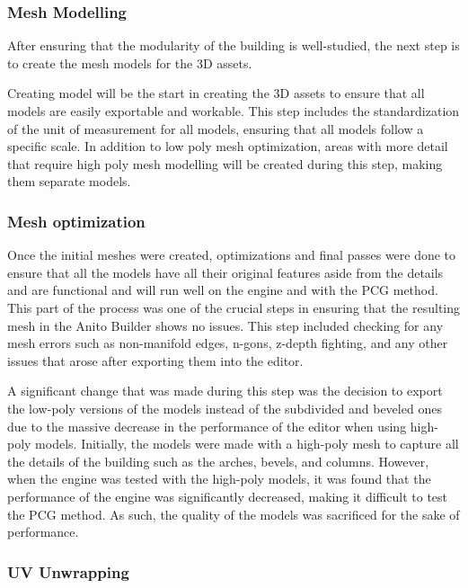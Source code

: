\documentclass[manuscript,screen,12pt]{article}
\begin{document}
\subsubsection{Mesh Modelling}

After ensuring that the modularity of the building is well-studied, the next step is to create the mesh models for the 3D assets.

Creating model will be the start in creating the 3D assets to ensure that all models are easily exportable and workable. This step includes the standardization of the unit of measurement for all models, ensuring that all models follow a specific scale.  In addition to low poly mesh optimization, areas with more detail that require high poly mesh modelling will be created during this step, making them separate models.
    
\subsubsection{Mesh optimization}

Once the initial meshes were created, optimizations and final passes were done to ensure that all the models have all their original features aside from the details and are functional and will run well on the engine and with the PCG method. This part of the process was one of the crucial steps in ensuring that the resulting mesh in the Anito Builder shows no issues. This step included checking for any mesh errors such as non-manifold edges, n-gons, z-depth fighting, and any other issues that arose after exporting them into the editor. 

A significant change that was made during this step was the decision to export the low-poly versions of the models instead of the subdivided and beveled ones due to the massive decrease in the performance of the editor when using high-poly models. Initially, the models were made with a high-poly mesh to capture all the details of the building such as the arches, bevels, and columns. However, when the engine was tested with the high-poly models, it was found that the performance of the engine was significantly decreased, making it difficult to test the PCG method. As such, the quality of the models was sacrificed for the sake of performance.

\subsubsection{UV Unwrapping}
\end{document}
